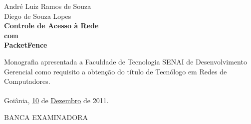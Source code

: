 \documentclass[12pt, brazil, ruledheader, pnumromarab,normaltoc]{abnt}
\begin{document}
\begin{folhadeaprovacao}
\setlength{\ABNTsignthickness}{0.4pt}
\setlength{\ABNTsignskip}{1cm}
\vspace*{0.2cm}
\begin{center}
\large André Luiz Ramos de Souza\\Diego de Souza Lopes\\
\vspace*{1.5cm}
\textbf{\LARGE Controle de Acesso à Rede\vspace{0.1cm}\\com\vspace{0.3cm}\\PacketFence}
\end{center}
\vspace*{1cm}
Monografia apresentada a Faculdade de Tecnologia SENAI de Desenvolvimento Gerencial como requisito a obtenção do título de Tecnólogo em Redes de Computadores.\\
\vspace*{0.2cm}\\
Goiânia, \uline{10}  de \uline{Dezembro} de 2011.\\
\begin{center}
BANCA EXAMINADORA
\end{center}
      
\end{folhadeaprovacao}
\sumario
\end{document}
